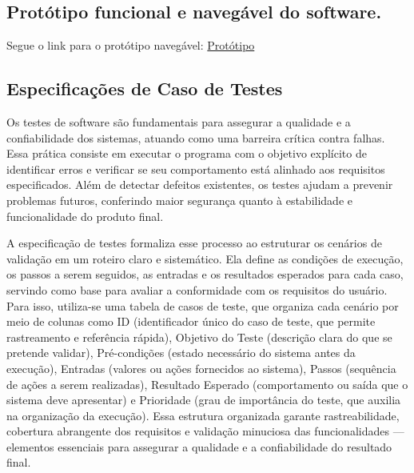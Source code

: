 \subsection{Protótipo funcional e navegável do software.}
Segue o link para o protótipo navegável: \href{https://www.figma.com/proto/EvktcpudU3xVgz8JVLDw5m/O%C3%A1sis-Prot%C3%B3tipo?node-id=1-2&t=MGDfspVva3MgOo6H-1&scaling=min-zoom&content-scaling=fixed&page-id=0%3A1&starting-point-node-id=1%3A2}{Protótipo}


\subsection{Especificações de Caso de Testes}

Os testes de software são fundamentais para assegurar a qualidade e a confiabilidade dos sistemas, atuando como uma barreira crítica contra falhas. Essa prática consiste em executar o programa com o objetivo explícito de identificar erros e verificar se seu comportamento está alinhado aos requisitos especificados. Além de detectar defeitos existentes, os testes ajudam a prevenir problemas futuros, conferindo maior segurança quanto à estabilidade e funcionalidade do produto final.

A especificação de testes formaliza esse processo ao estruturar os cenários de validação em um roteiro claro e sistemático. Ela define as condições de execução, os passos a serem seguidos, as entradas e os resultados esperados para cada caso, servindo como base para avaliar a conformidade com os requisitos do usuário. Para isso, utiliza-se uma tabela de casos de teste, que organiza cada cenário por meio de colunas como ID (identificador único do caso de teste, que permite rastreamento e referência rápida), Objetivo do Teste (descrição clara do que se pretende validar), Pré-condições (estado necessário do sistema antes da execução), Entradas (valores ou ações fornecidos ao sistema), Passos (sequência de ações a serem realizadas), Resultado Esperado (comportamento ou saída que o sistema deve apresentar) e Prioridade (grau de importância do teste, que auxilia na organização da execução). Essa estrutura organizada garante rastreabilidade, cobertura abrangente dos requisitos e validação minuciosa das funcionalidades — elementos essenciais para assegurar a qualidade e a confiabilidade do resultado final.


\tiny 

